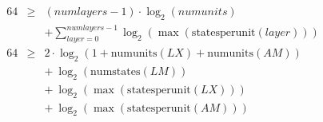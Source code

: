 \documentclass{article}
\begin{document}
\begin{eqnarray}
64 & \ge & (numlayers-1) \cdot \log_2(numunits) \\
        && +  \sum\limits_{layer=0}^{numlayers-1} \log_2(\max(\mathrm{statesperunit}(layer))) \\
64 & \ge & 2 \cdot \log_2(1+\mathrm{numunits}(LX)+\mathrm{numunits}(AM)) \\
        && +\ \log_2(\mathrm{numstates}(LM)) \\
        && +\ \log_2(\max(\mathrm{statesperunit}(LX))) \\
        && +\ \log_2(\max(\mathrm{statesperunit}(AM)))
\end{eqnarray}
\end{document}
